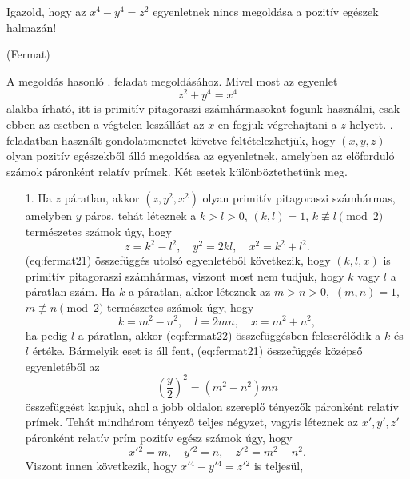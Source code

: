 \begin{extraproblem}
	Igazold, hogy az $x^{4}-y^{4}=z^{2}$ egyenletnek nincs megoldása
	a pozitív egészek halmazán! 
	\begin{flushright}
		(Fermat) 
		\par\end{flushright}
\end{extraproblem}

\begin{solution}
	A megoldás hasonló . feladat megoldásához. Mivel
	most az egyenlet 
	\[
	z^{2}+y^{4}=x^{4}
	\]
	alakba írható, itt is primitív pitagoraszi számhármasokat fogunk használni,
	csak ebben az esetben a végtelen leszállást az $x$-en fogjuk végrehajtani
	a $z$ helyett. . feladatban használt gondolatmenetet
	követve feltételezhetjük, hogy $(x,y,z)$ olyan pozitív egészekből
	álló megoldása az egyenletnek, amelyben az előforduló számok páronként
	relatív prímek. Két esetek különböztethetünk meg.
	\begin{itemize}
		\item[1.] Ha $z$ páratlan, akkor $(z,y^{2},x^{2})$ olyan primitív pitagoraszi
		számhármas, amelyben $y$ páros, tehát léteznek a $k>l>0$, $(k,l)=1$,
		$k\not\equiv l\pmod 2$ természetes számok úgy, hogy 
		\begin{equation}
			z=k^{2}-l^{2},\quad y^{2}=2kl,\quad x^{2}=k^{2}+l^{2}.\label{eq:fermat21}
		\end{equation}
		\Aref({eq:fermat21}) összefüggés utolsó egyenletéből következik,
		hogy $(k,l,x)$ is primitív pitagoraszi számhármas, viszont most nem
		tudjuk, hogy $k$ vagy $l$ a páratlan szám. Ha $k$ a páratlan, akkor
		léteznek az $m>n>0,$ $(m,n)=1$, $m\not\equiv n\pmod 2$ természetes
		számok úgy, hogy 
		\begin{equation}
			k=m^{2}-n^{2},\quad l=2mn,\quad x=m^{2}+n^{2},\label{eq:fermat22}
		\end{equation}
		ha pedig $l$ a páratlan, akkor \aref({eq:fermat22}) összefüggésben
		felcserélődik a $k$ és $l$ értéke. Bármelyik eset is áll fent, \aref({eq:fermat21})
		összefüggés középső egyenletéből az 
		\[
		\left(\frac{y}{2}\right)^{2}=(m^{2}-n^{2})mn
		\]
		összefüggést kapjuk, ahol a jobb oldalon szereplő tényezők páronként
		relatív prí\-mek. Tehát mindhárom tényező teljes négyzet, vagyis
		léteznek az $x',y',z'$ pá\-ron\-ként relatív prím pozitív egész
		számok úgy, hogy 
		\[
		x'{}^{2}=m,\quad y'{}^{2}=n,\quad z'{}^{2}=m^{2}-n^{2}.
		\]
		Viszont innen következik, hogy $x'{}^{4}-y'{}^{4}=z'{}^{2}$ is teljesül,

\end{itemize}
\end{solution}
